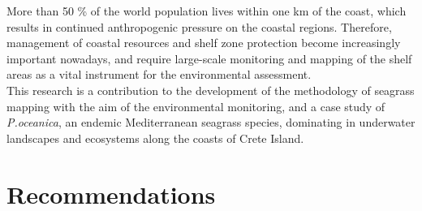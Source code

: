 \documentclass[11pt]{article}
\begin{document}
More than 50 \% of the world population lives within one km of the coast, which results in continued anthropogenic pressure on the coastal regions. Therefore, management of coastal resources and shelf zone protection become increasingly important nowadays, and require large-scale monitoring and mapping of the shelf areas as a vital instrument for the environmental assessment.\vspace{1ex}\\
This research is a contribution to the development of the methodology of seagrass mapping with the aim of the environmental monitoring, and a case study of \textit{P.oceanica}, an endemic Mediterranean seagrass species, dominating in underwater landscapes and ecosystems along the coasts of Crete Island.
\pagebreak

\section*{Recommendations}\label{sec:7}
\singlespacing
\end{document}
